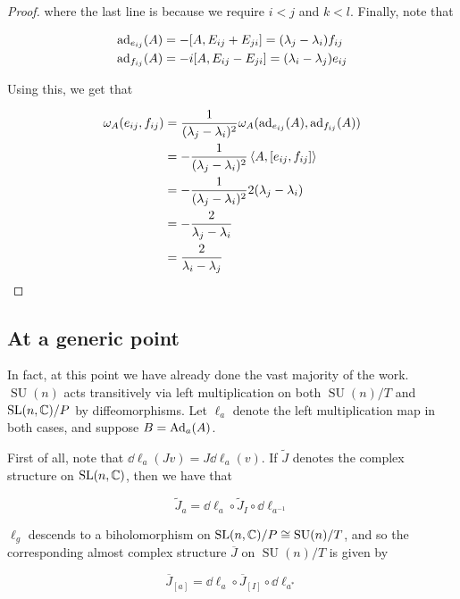 \documentclass{article}
\DeclareMathOperator{\SU}{SU}
\renewcommand{\tilde}{\widetilde}
\begin{document}
\begin{proof}
where the last line is because we require \(i < j\) and \(k < l\). Finally, note that

\begin{align*}
    \operatorname{ad}_{e_{ij}}(A) &= -[A, E_{ij} + E_{ji}] = (\lambda_j - \lambda_i)f_{ij} \\
    \operatorname{ad}_{f_{ij}}(A) &= -i[A, E_{ij} - E_{ji}] = (\lambda_i - \lambda_j)e_{ij}
\end{align*}

Using this, we get that

\begin{align*}
    \omega_A(e_{ij}, f_{ij}) &= \frac{1}{(\lambda_j - \lambda_i)^2}\omega_A(\operatorname{ad}_{e_{ij}}(A), \operatorname{ad}_{f_{ij}}(A)) \\
    &= -\frac{1}{(\lambda_j - \lambda_i)^2}\left\langle A, [e_{ij}, f_{ij}] \right\rangle \\
    &= -\frac{1}{(\lambda_j - \lambda_i)^2}2(\lambda_j - \lambda_i) \\
    &= -\frac{2}{\lambda_j - \lambda_i} \\
    &= \frac{2}{\lambda_i - \lambda_j}
\end{align*}

\end{proof}

\subsection{At a generic point}

In fact, at this point we have already done the vast majority of the work. \(\SU(n)\) acts transitively via left multiplication on both \(\SU(n)/T\) and \(\operatorname{SL}(n, \mathbb{C})/P\) by diffeomorphisms. Let \(\ell_a\) denote the left multiplication map in both cases, and suppose \(B = \operatorname{Ad}_a(A)\).

First of all, note that \(\dd \ell_a(Jv) = J\dd\ell_a(v)\). If \(\tilde J\) denotes the complex structure on \(\operatorname{SL}(n, \mathbb{C})\), then we have that

\[\tilde J_a = \dd \ell_a \circ \tilde J_I \circ \dd\ell_{a^{-1}}\]

\(\ell_g\) descends to a biholomorphism on \(\SL(n, \C)/P \cong \SU(n)/T\), and so the corresponding almost complex structure \(\overline J\) on \(\SU(n)/T\) is given by

\begin{equation}
    \label{eq:cx-str-quot}
    \overline J_{[a]} = \dd\ell_a \circ \overline J_{[I]} \circ \dd\ell_{a^*}
\end{equation}
\end{document}

